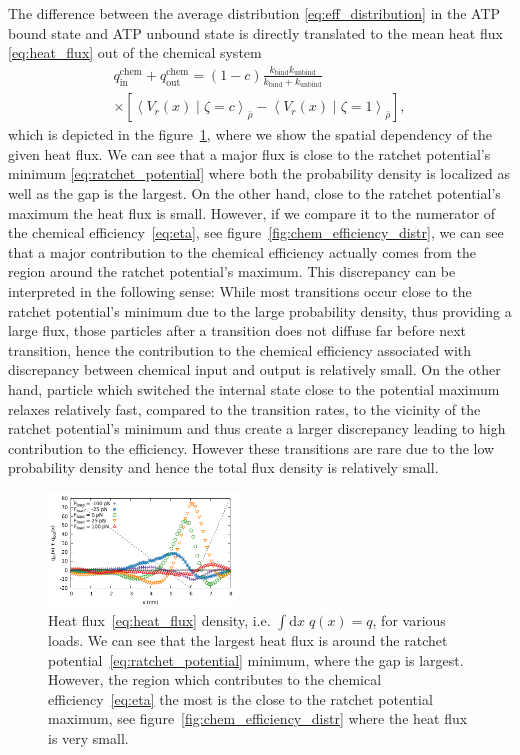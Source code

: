 \documentclass[aps,pre,twocolumn,showpacs,showkeys,superscriptaddress,floatfix]{revtex4-1}
\newcommand{\rmd}{{\mathrm d}}
\begin{document}
The difference between the average distribution \eqref{eq:eff_distribution} in the ATP bound state and ATP unbound state is directly translated to the mean heat flux \eqref{eq:heat_flux} out of the chemical system
\begin{multline}
q_\text{in}^\text{chem} + q_\text{out}^\text{chem} 
= (1-c) \frac{ k_\text{bind} k_\text{unbind} }{ k_\text{bind} + k_\text{unbind} } 
\\ \times
\left[ \left\langle V_r(x) \middle| \zeta = c \right\rangle_{\bar{\rho}} - \left\langle V_r(x) \middle| \zeta = 1 \right\rangle_{\bar{\rho}} \right] ,
\label{eq:heat_flux}
\end{multline} 
which is depicted in the figure~\ref{fig:chem_energy_distr}, 
where we show the spatial dependency of the given heat flux.
We can see that a major flux is close to the ratchet potential's minimum \eqref{eq:ratchet_potential} where both the probability density is localized as well as the gap is the largest. 
On the other hand, close to the ratchet potential's maximum the heat flux is small.
However, if we compare it to the numerator of the chemical efficiency~\eqref{eq:eta}, see figure~\ref{fig:chem_efficiency_distr}, 
we can see that a major contribution to the chemical efficiency actually comes from the region around the ratchet potential's maximum.
This discrepancy can be interpreted in the following sense: 
While most transitions occur close to the ratchet potential's minimum due to the large probability density, thus providing a large flux, 
those particles after a transition does not diffuse far before next transition, 
hence the contribution to the chemical efficiency associated with discrepancy between chemical input and output is relatively small. 
On the other hand, particle which switched the internal state close to the potential maximum relaxes relatively fast, compared to the transition rates, 
to the vicinity of the ratchet potential's minimum and thus create a larger discrepancy leading to high contribution to the efficiency. 
However these transitions are rare due to the low probability density and hence the total flux density is relatively small.  
\begin{figure}[t]
\centering
\includegraphics[width=0.45\textwidth,height=!]{chem_energy_distr_all_F}
\caption{
\label{fig:chem_energy_distr}
Heat flux~\eqref{eq:heat_flux} density, i.e. $\int \rmd x \; q(x) = q$, for various loads.  
We can see that the largest heat flux is around the ratchet potential~\eqref{eq:ratchet_potential} minimum, where the gap is largest. 
However, the region which contributes to the chemical efficiency~\eqref{eq:eta} the most is the close to the ratchet potential maximum, 
see figure~\ref{fig:chem_efficiency_distr} where the heat flux is very small. 
}
\end{figure}
\end{document}

